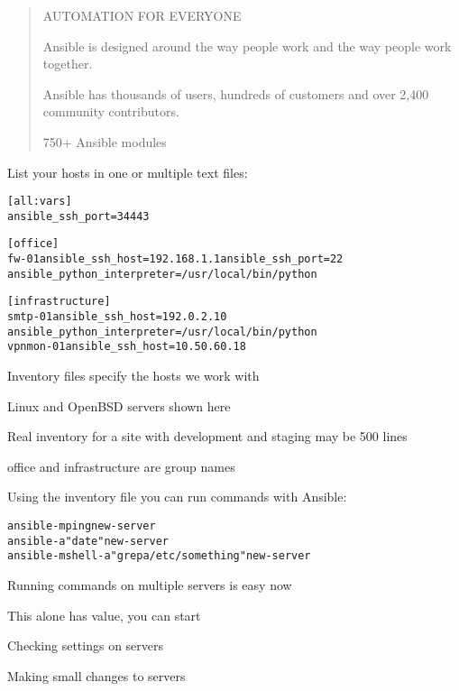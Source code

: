 \documentclass[Screen16to9,17pt]{foils}
\begin{document}

\begin{quote}\small
AUTOMATION FOR EVERYONE

Ansible is designed around the way people work and the way people work together.

Ansible has thousands of users, hundreds of customers and over 2,400 community contributors.

750+ Ansible modules
\end{quote}



List your hosts in one or multiple text files:
\begin{alltt}\footnotesize
[all:vars]
ansible_ssh_port=34443

[office]
fw-01 ansible_ssh_host=192.168.1.1 ansible_ssh_port=22
ansible_python_interpreter=/usr/local/bin/python

[infrastructure]
smtp-01     ansible_ssh_host=192.0.2.10
ansible_python_interpreter=/usr/local/bin/python
vpnmon-01   ansible_ssh_host=10.50.60.18

\end{alltt}

\begin{list2}
\item Inventory files specify the hosts we work with
\item Linux and OpenBSD servers shown here
\item Real inventory for a site with development and staging may be 500 lines
\item office and infrastructure are group names
\end{list2}



Using the inventory file you can run commands with Ansible:

\begin{alltt}\footnotesize
  ansible -m ping new-server
  ansible -a "date" new-server
  ansible -m shell -a "grep a /etc/something" new-server
\end{alltt}

\begin{list2}
\item Running commands on multiple servers is easy now
\item This alone has value, you can start
\item Checking settings on servers
\item Making small changes to servers
\end{list2}
\end{document}
